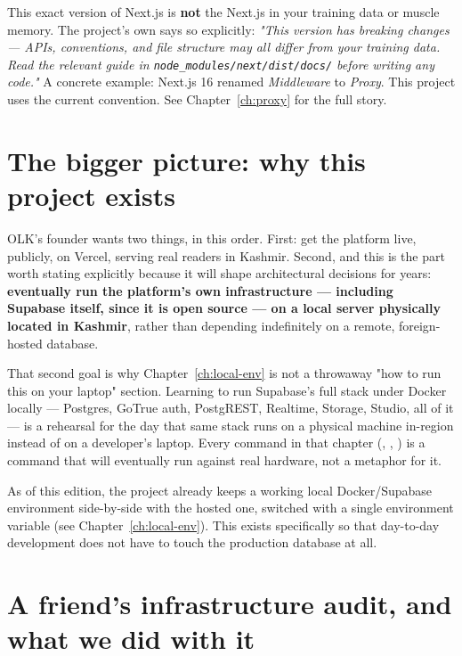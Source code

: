 \begin{olkwarn}
This exact version of Next.js is \textbf{not} the Next.js in your training data or muscle memory. The project's own  says so explicitly: \emph{"This version has breaking changes — APIs, conventions, and file structure may all differ from your training data. Read the relevant guide in \texttt{node\_modules/next/dist/docs/} before writing any code."} A concrete example: Next.js 16 renamed \emph{Middleware} to \emph{Proxy}. This project uses the current  convention. See Chapter~\ref{ch:proxy} for the full story.
\end{olkwarn}

\section{The bigger picture: why this project exists}

OLK's founder wants two things, in this order. First: get the platform live, publicly, on Vercel, serving real readers in Kashmir. Second, and this is the part worth stating explicitly because it will shape architectural decisions for years: \textbf{eventually run the platform's own infrastructure — including Supabase itself, since it is open source — on a local server physically located in Kashmir}, rather than depending indefinitely on a remote, foreign-hosted database.

That second goal is why Chapter~\ref{ch:local-env} is not a throwaway "how to run this on your laptop" section. Learning to run Supabase's full stack under Docker locally — Postgres, GoTrue auth, PostgREST, Realtime, Storage, Studio, all of it — is a rehearsal for the day that same stack runs on a physical machine in-region instead of on a developer's laptop. Every command in that chapter (, , ) is a command that will eventually run against real hardware, not a metaphor for it.

\begin{olknote}
As of this edition, the project already keeps a working local Docker/Supabase environment side-by-side with the hosted one, switched with a single environment variable (see Chapter~\ref{ch:local-env}). This exists specifically so that day-to-day development does not have to touch the production database at all.
\end{olknote}

\section{A friend's infrastructure audit, and what we did with it}
\label{sec:infra-audit}

